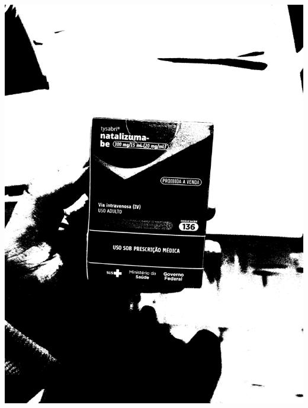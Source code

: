 \begin{frame}
	\centering
	\begin{columns}
		\begin{column}{0.24\textwidth}\centering
			\includegraphics[height=0.35\textheight]{../pictures/tysabri_gray_thresh.jpg}
			\\\vspace{\floatsep}

\end{column}
\end{columns}
\end{frame}
